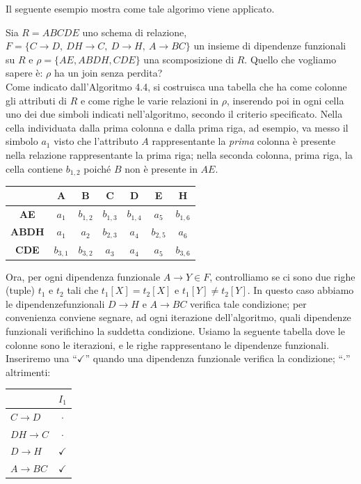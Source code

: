 Il seguente esempio mostra come tale algorimo viene applicato.\\
\begin{exmp}
 Sia $R=ABCDE$ uno schema di relazione, $F=\{C\rightarrow D,\ DH\rightarrow C,\ D\rightarrow H,\ A \rightarrow BC\}$
 un insieme di dipendenze funzionali su $R$ e $\rho = \{AE, ABDH, CDE\}$ una scomposizione di $R$. Quello che 
 vogliamo sapere è: $\rho$ ha un join senza perdita?\\
 Come indicato dall'Algoritmo 4.4, si costruisca una tabella che ha come colonne gli attributi di $R$ e come 
 righe le varie relazioni in $\rho$, inserendo poi in ogni cella uno dei due simboli indicati nell'algoritmo,
 secondo il criterio specificato. Nella cella individuata dalla prima colonna e dalla prima riga, ad esempio, 
 va messo il simbolo $a_1$ visto che l'attributo $A$ rappresentante la \emph{prima} colonna è presente nella 
 relazione rappresentante la prima riga; nella seconda colonna, prima riga, la cella contiene $b_{1,2}$ poiché
 $B$ non è presente in $AE$.
 \begin{center}
  \begin{tabular}{c|c|c|c|c|c|c}
    & \textbf{A} & \textbf{B} &\textbf{C}&\textbf{D}&\textbf{E}&\textbf{H}\\
   \hline
   \textbf{AE} & $a_1$ & $b_{1,2}$ & $b_{1,3}$ & $b_{1,4}$ & $a_5$ & $b_{1,6}$\\
   \hline
   \textbf{ABDH}& $a_1$ & $a_2$ & $b_{2,3}$ & $a_4$ & $b_{2,5}$ & $a_6$\\
   \hline
   \textbf{CDE} & $b_{3,1}$ & $b_{3,2}$ & $a_3$ & $a_4$ & $a_5$ & $b_{3,6}$\\
  \end{tabular}
 \end{center}
 
 Ora, per ogni dipendenza funzionale $A\rightarrow Y \in F$, controlliamo se ci sono due righe (tuple) $t_1$
 e $t_2$ tali che $t_1[X] = t_2[X]$ e $t_1[Y] \not= t_2[Y]$. In questo caso abbiamo le dipendenzefunzionali $D\rightarrow H$ e 
 $A \rightarrow BC$ verifica tale condizione; per convenienza conviene segnare, ad ogni iterazione dell'algoritmo, quali 
 dipendenze funzionali verifichino la suddetta condizione. Usiamo la seguente tabella dove le colonne sono le iterazioni, 
 e le righe rappresentano le dipendenze funzionali. Inseriremo una ``$\checkmark$'' quando una dipendenza funzionale 
 verifica la condizione; ``$\cdot$'' altrimenti:\\
 \begin{center}
  \begin{tabular}{l|c|}
   & $I_1$\\
   \hline
   $C\rightarrow D$ & $\cdot$\\
   $DH\rightarrow C$& $\cdot$\\
   $D \rightarrow H$ & $\checkmark$\\
   $A \rightarrow BC$ & $\checkmark$\\
  \end{tabular}
 \end{center}
 

\end{exmp}
